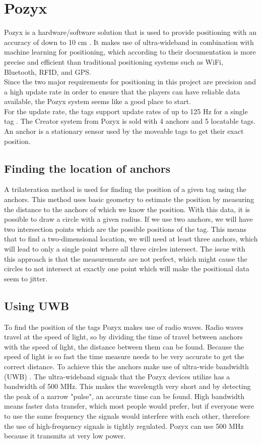 \section{Pozyx}
Pozyx is a hardware/software solution that is used to provide positioning with an accuracy of down to 10 cm \cite{pozyx}.
It makes use of ultra-wideband in combination with machine learning for positioning, which according to their documentation is more precise and efficient than traditional positioning systems such as WiFi, Bluetooth, RFID, and GPS.
\\
Since the two major requirements for positioning in this project are precision and a high update rate in order to ensure that the players can have reliable data available, the Pozyx system seems like a good place to start.
\\
For the update rate, the tags support update rates of up to 125 Hz for a single tag \cite{pozyx}.
The Creator system from Pozyx is sold with 4 anchors and 5 locatable tags.
An anchor is a stationary sensor used by the moveable tags to get their exact position.
\subsection{Finding the location of anchors}
A trilateration method is used for finding the position of a given tag using the anchors.
This method uses basic geometry to estimate the position by measuring the distance to the anchors of which we know the position.
With this data, it is possible to draw a circle with a given radius.
If we use two anchors, we will have two intersection points which are the possible positions of the tag.
This means that to find a two-dimensional location, we will need at least three anchors, which will lead to only a single point where all three circles intersect.
The issue with this approach is that the measurements are not perfect, which might cause the circles to not intersect at exactly one point which will make the positional data seem to jitter.

\subsection{Using UWB}
To find the position of the tags Pozyx makes use of radio waves. 
Radio waves travel at the speed of light, so by dividing the time of travel between anchors with the speed of light, the distance between them can be found.
Because the speed of light is so fast the time measure needs to be very accurate to get the correct distance.
To achieve this the anchors make use of ultra-wide bandwidth (UWB) \cite{pozyx-UWB}.
The ultra-wideband signals that the Pozyx devices utilize has a bandwidth of 500 MHz.
This makes the wavelength very short and by detecting the peak of a narrow "pulse", an accurate time can be found.
High bandwidth means faster data transfer, which most people would prefer, but if everyone were to use the same frequency the signals would interfere with each other, therefore the use of high-frequency signals is tightly regulated.
Pozyx can use 500 MHz because it transmits at very low power.

